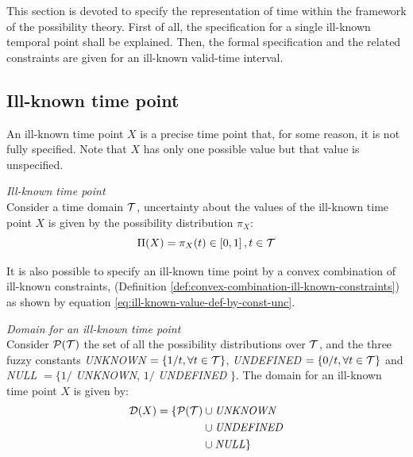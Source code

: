 %
%

This section is devoted to specify the representation of time within the framework of the possibility theory. First of all, the specification for a single ill-known temporal point shall be explained. Then, the formal specification and the related constraints are given for an ill-known valid-time interval.

\subsection{\label{subsec:ill-known-point-rep}Ill-known time point}
An ill-known time point $X$ is a precise time point that, for some reason, it is not fully specified. Note that $X$ has only one possible value but that value is unspecified.

\begin{definition}
\label{def:ill-known-time-point}
\emph{Ill-known time point}\\
Consider a time domain $\mathcal{T}$, uncertainty about the values of the ill-known time point $X$ is given by the possibility distribution $\pi_X$:
\begin{equation}
\label{eq:ill-known-time-point}
\Pi(X) = \pi_X(t) \in \left[0,1\right] , t \in \mathcal{T}
\end{equation}
\end{definition}

It is also possible to specify an ill-known time point by a convex combination of ill-known constraints, (Definition \ref{def:convex-combination-ill-known-constraints}) as shown by equation \eqref{eq:ill-known-value-def-by-const-unc}.



\begin{definition}
\label{def:ill-known-domain}
\emph{Domain for an ill-known time point}\\
Consider $\mathcal{P}(\mathcal{T})$ the set of all the possibility distributions over $\mathcal{T}$, and the three fuzzy constants \emph{UNKNOWN} $=\left\lbrace 1/t, \forall t \in \mathcal{T} \right\rbrace$, \emph{UNDEFINED} $=\left\lbrace 0/t,\forall t \in \mathcal{T} \right\rbrace$ and \emph{NULL} $=\lbrace 1/$ \emph{UNKNOWN}, $1/$ \emph{UNDEFINED} $\rbrace$. The domain for an ill-known time point $X$ is given by: 
\begin{align}
\label{eq:ill-known-domain}
\Dom (X) =  \lbrace \Pow(\T) & \cup \mbox{\emph{UNKNOWN}} \\
\nonumber
&\cup \mbox{\emph{UNDEFINED}} \\
\nonumber
&\cup \mbox{\emph{NULL}} \rbrace
%
\end{align}
\end{definition}




